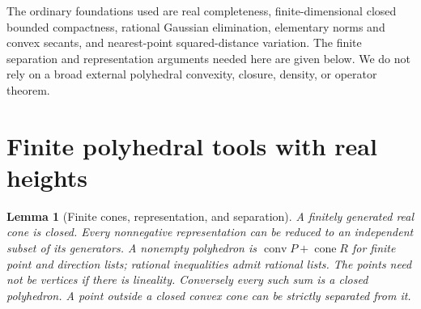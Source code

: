 \documentclass[11pt]{article}
\newtheorem{lemma}[theorem]{Lemma}
\theoremstyle{definition}\newtheorem{definition}[theorem]{Definition}
\theoremstyle{remark}\newtheorem{remark}[theorem]{Remark}
\newcommand{\conv}{\operatorname{conv}}\newcommand{\cone}{\operatorname{cone}}
\begin{document}
The ordinary foundations used are real completeness, finite-dimensional closed bounded compactness, rational Gaussian elimination, elementary norms and convex secants, and nearest-point squared-distance variation. The finite separation and representation arguments needed here are given below. We do not rely on a broad external polyhedral convexity, closure, density, or operator theorem.

\section{Finite polyhedral tools with real heights}
\begin{lemma}[Finite cones, representation, and separation]\label{l:cone}
A finitely generated real cone is closed. Every nonnegative representation can be reduced to an independent subset of its generators. A nonempty polyhedron is $\conv P+\cone R$ for finite point and direction lists; rational inequalities admit rational lists. The points need not be vertices if there is lineality. Conversely every such sum is a closed polyhedron. A point outside a closed convex cone can be strictly separated from it.
\end{lemma}
\end{document}

